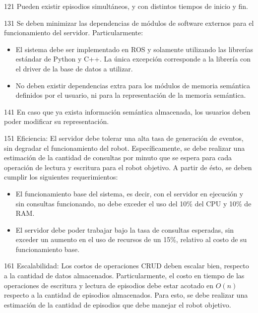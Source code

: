 \begin{requisito-sistema}{12}{1}
	Pueden existir episodios simultáneos, y con distintos tiempos de inicio y fin.
\end{requisito-sistema}

\begin{requisito-sistema}{13}{1}
	Se deben minimizar las dependencias de módulos de software externos para el funcionamiento del servidor. Particularmente:
	\begin{itemize}
		\item El sistema debe ser implementado en ROS y solamente utilizando las librerías estándar de Python y C++. La única excepción corresponde a la librería con el driver de la base de datos a utilizar.
		\item No deben existir dependencias extra para los módulos de memoria semántica definidos por el usuario, ni para la representación de la memoria semántica.	
	\end{itemize}
\end{requisito-sistema}

\begin{requisito-sistema}{14}{1}
	En caso que ya exista información semántica almacenada, los usuarios deben poder modificar su representación.	
\end{requisito-sistema}

\begin{requisito-sistema}{15}{1}
	Eficiencia: El servidor debe tolerar una alta tasa de generación de eventos, sin degradar el funcionamiento del robot. Específicamente, se debe realizar una estimación de la cantidad de consultas por minuto que se espera para cada operación de lectura y escritura para el robot objetivo. A partir de ésto, se deben cumplir los siguientes requerimientos:
	\begin{itemize}
		\item El funcionamiento base del sistema, es decir, con el servidor en ejecución y sin consultas funcionando, no debe exceder el uso del 10\% del CPU y 10\% de RAM.
		\item El servidor debe poder trabajar bajo la tasa de consultas esperadas, sin exceder un aumento en el uso de recursos de un 15\%, relativo al costo de su funcionamiento base.
	\end{itemize}
\end{requisito-sistema}

\begin{requisito-sistema}{16}{1}
	Escalabilidad: Los costos de operaciones CRUD deben escalar bien, respecto a la cantidad de datos almacenados. Particularmente, el costo en tiempo de las operaciones de escritura y lectura de episodios debe estar acotado en $O(n)$ respecto a la cantidad de episodios almacenados. Para esto, se debe realizar una estimación de la cantidad de episodios que debe manejar el robot objetivo.
\end{requisito-sistema}

